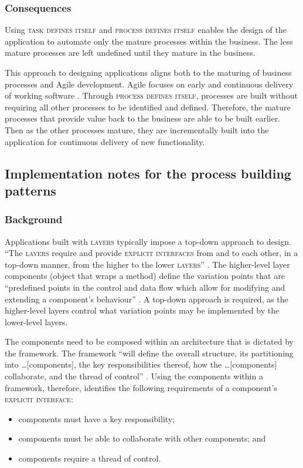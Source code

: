 \documentclass[prodmode]{style/acmlarge}
\begin{document}
\subsubsection*{Consequences} Using \textsc{task defines itself} and
\textsc{process defines itself} enables the design of the application to
automate only the mature processes within the business.  The less mature
processes are left undefined until they mature in the business.

This approach to designing applications aligns both to the maturing of business
processes and Agile development.  Agile focuses on early and continuous delivery
of working software \cite{agile-manifesto}.  Through \textsc{process defines
itself}, processes are built without requiring all other processes to be
identified and defined.  Therefore, the mature processes that provide value back
to the business are able to be built earlier.  Then as the other processes
mature, they are incrementally built into the application for continuous
delivery of new functionality.


\subsection{Implementation notes for the process building patterns}

\subsubsection*{Background}

Applications built with \textsc{layers} typically impose a top-down approach to
design.  ``The \textsc{layers} require and provide \textsc{explicit interfaces}
from and to each other, in a top-down manner, from the higher to the lower
\textsc{layers}'' \cite[p. 11]{ioc}.  The higher-level layer components (object
that wraps a method) define the variation points that are
``predefined points in the control and data flow which allow for modifying and
extending a component's behaviour'' \cite[p. 5]{ioc}.  A top-down approach is
required, as the higher-level layers control what variation points may be
implemented by the lower-level layers.

The components need to be composed within an architecture that is dictated by
the framework.  The framework ``will define the overall structure, its
partitioning into \ldots [components], the key responsibilities thereof, how the
\ldots [components] collaborate, and the thread of control'' \cite[p.26]{gof}.
Using the components within a framework, therefore, identifies the following
requirements of a component's \textsc{explicit interface}:
\begin{itemize}
  \item components must have a key responsibility;
  \item components must be able to collaborate with other components; and
  \item components require a thread of control.
\end{itemize}
\end{document}
